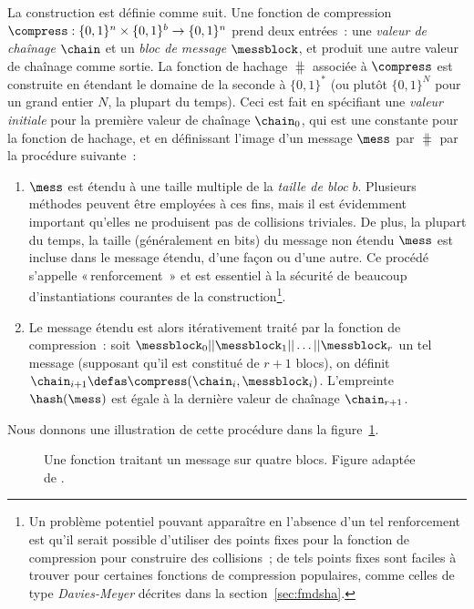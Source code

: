 La construction \merkdam est définie comme suit. Une fonction de compression
$\compress : \{0,1\}^n \times \{0,1\}^b \rightarrow \{0,1\}^n$
prend deux entrées~: une \emph{valeur de chaînage} $\chain$ et un \emph{bloc de message} $\messblock$, et produit une autre valeur de chaînage comme sortie.
La fonction de hachage
$\hash$ associée à $\compress$ est construite en étendant le domaine de la seconde à $\{0,1\}^*$ (ou plutôt $\{0,1\}^N$ pour un grand entier $N$, la plupart du temps).
Ceci est fait en spécifiant une \emph{valeur initiale} \iv pour la première valeur de chaînage
$\chain_0$, qui est une constante pour la fonction de hachage, et en définissant l'image d'un message
$\mess$ par $\hash$ par la procédure suivante~:
\begin{enumerate}
\item $\mess$ est étendu
à une taille multiple de la \emph{taille de bloc} $b$. Plusieurs méthodes peuvent être employées à ces fins, mais il est évidemment important
qu'elles ne produisent pas de collisions triviales. De plus, la plupart du temps, la taille (généralement en bits) du message non étendu
$\mess$ est incluse dans le message étendu, d'une façon ou d'une autre. Ce procédé s'appelle «\,renforcement \merkdam\,» et est essentiel
à la sécurité de beaucoup d'instantiations courantes de la construction\footnote{Un problème potentiel pouvant
apparaître en l'absence d'un tel renforcement est qu'il serait possible d'utiliser des points fixes pour la fonction de compression pour
construire des collisions~; de tels points fixes sont faciles à trouver pour certaines fonctions de compression populaires, comme celles de type
\emph{Davies-Meyer} décrites dans la section~\ref{sec:fmdsha}.}.
\item Le message étendu est alors itérativement traité par la fonction de compression~: soit
$\messblock_0||\messblock_1||\ldots||\messblock_r$ un tel message (supposant qu'il est constitué de
$r+1$ blocs), on définit $\chain_{i+1} \defas \compress(\chain_i, \messblock_i)$. L'empreinte $\hash(\mess)$ est égale à la dernière valeur de chaînage
$\chain_{r+1}$.
\end{enumerate}

Nous donnons une illustration de cette procédure dans la figure~\ref{fig:fmerk}.

\begin{figure}[!htb]
\begin{center}

\caption[Une fonction \merkdam traitant un message sur quatre blocs.]{Une fonction \merkdam traitant un message sur quatre blocs. Figure adaptée de \cite{TiKZ:Cryptographers}.\label{fig:fmerk}}
\end{center}
\end{figure} 

